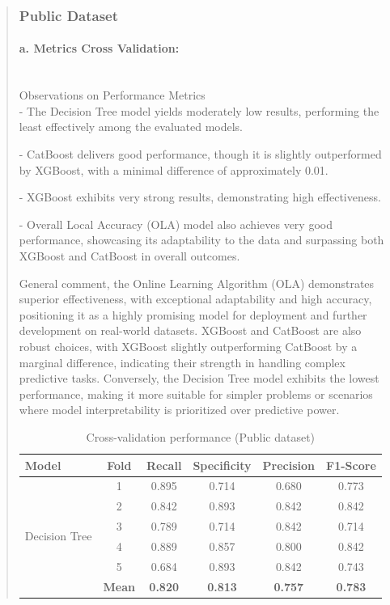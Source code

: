 \documentclass[runningheads]{llncs}
\begin{document}
\begin{abstract}
\subsubsection{Public Dataset}
\paragraph{\textbf{a. Metrics Cross Validation:}} \\
Observations on Performance Metrics\\

- The Decision Tree model yields moderately low results, performing the least effectively among the evaluated models.

- CatBoost delivers good performance, though it is slightly outperformed by XGBoost, with a minimal difference of approximately 0.01.

- XGBoost exhibits very strong results, demonstrating high effectiveness.

- Overall Local Accuracy (OLA) model also achieves very good performance, showcasing its adaptability to the data and surpassing both XGBoost and CatBoost in overall outcomes.

General comment, the Online Learning Algorithm (OLA) demonstrates superior effectiveness, with exceptional adaptability and high accuracy, positioning it as a highly promising model for deployment and further development on real-world datasets. XGBoost and CatBoost are also robust choices, with XGBoost slightly outperforming CatBoost by a marginal difference, indicating their strength in handling complex predictive tasks. Conversely, the Decision Tree model exhibits the lowest performance, making it more suitable for simpler problems or scenarios where model interpretability is prioritized over predictive power.
\begin{table}[H]
\caption{Cross-validation performance (Public dataset)}
\label{tab:cv-public}
\centering
\small
\setlength{\tabcolsep}{4pt}
\renewcommand{\arraystretch}{1.1}
\begin{tabular}{|l|c|c|c|c|c|}
\hline
\textbf{Model} & \textbf{Fold} & \textbf{Recall} & \textbf{Specificity} & \textbf{Precision} & \textbf{F1-Score} \\
\hline
\multirow{6}{*}{Decision Tree}
& 1 & 0.895 & 0.714 & 0.680 & 0.773 \\
& 2 & 0.842 & 0.893 & 0.842 & 0.842 \\
& 3 & 0.789 & 0.714 & 0.842 & 0.714 \\
& 4 & 0.889 & 0.857 & 0.800 & 0.842 \\
& 5 & 0.684 & 0.893 & 0.842 & 0.743 \\
& \textbf{Mean} & \textbf{0.820} & \textbf{0.813} & \textbf{0.757} & \textbf{0.783} \\
\hline


\end{tabular}
\end{table}
\end{abstract}
\end{document}
